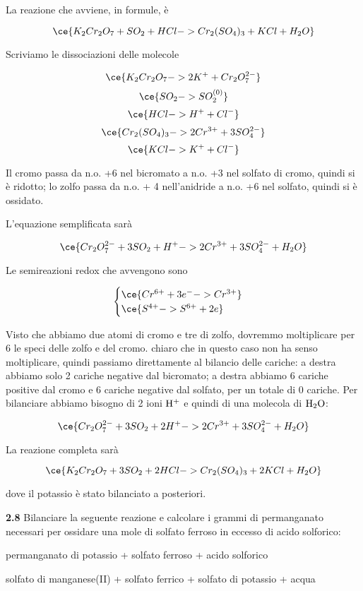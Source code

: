 \vspace{0.2cm}La reazione che avviene, in formule, è

$$\ce{K_2Cr_2O_7 + SO_2 + HCl -> Cr_2(SO_4)_3 + KCl + H_2O}$$

Scriviamo le dissociazioni delle molecole

$$\ce{K_2Cr_2O_7 -> 2K^+ + Cr_2O_7^{2-}}$$
$$\ce{SO_2 -> SO_2^{(0)}}$$
$$\ce{HCl -> H^+ + Cl^-}$$
$$\ce{Cr_2(SO_4)_3 -> 2Cr^{3+} + 3SO_4^{2-}}$$
$$\ce{KCl -> K^+ + Cl^-}$$

Il cromo passa da n.o. +6 nel bicromato a n.o. +3 nel solfato di cromo, quindi si è ridotto; lo zolfo passa da n.o. + 4 nell'anidride a n.o. +6 nel solfato, quindi si è ossidato.

L'equazione semplificata sarà

$$\ce{Cr_2O_7^{2-} + 3SO_2 + H^+ -> 2Cr^{3+} + 3SO_4^{2-} + H_2O}$$

Le semireazioni redox che avvengono sono

$$\begin{cases}
    \ce{Cr^{6+} +3e^- -> Cr^{3+}}\\
    \ce{S^{4+} -> S^{6+} +2e}
\end{cases}$$

Visto che abbiamo due atomi di cromo e tre di zolfo, dovremmo moltiplicare per 6 le speci delle zolfo e del cromo. \E chiaro che in questo caso non ha senso moltiplicare, quindi passiamo direttamente al bilancio delle cariche: a destra abbiamo solo 2 cariche negative dal bicromato; a destra abbiamo 6 cariche positive dal cromo e 6 cariche negative dal solfato, per un totale di 0 cariche. Per bilanciare abbiamo bisogno di 2 ioni $\rm H^+$ e quindi di una molecola di $\rm H_2O$:

$$\ce{Cr_2O_7^{2-} + 3SO_2 + 2H^+ -> 2Cr^{3+} + 3SO_4^{2-} + H_2O}$$

La reazione completa sarà

$$\ce{K_2Cr_2O_7 + 3SO_2 + 2HCl -> Cr_2(SO_4)_3 + 2KCl + H_2O}$$

dove il potassio è stato bilanciato a posteriori.

\vspace{0.2cm}\textbf{2.8} Bilanciare la seguente reazione e calcolare i grammi di permanganato necessari per ossidare una
mole di solfato ferroso in eccesso di acido solforico:

\begin{center}
permanganato di potassio + solfato ferroso + acido solforico \ce{->}

\ce{->}solfato di manganese(II) + solfato ferrico + solfato di potassio + acqua
\end{center}

